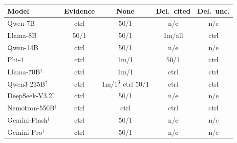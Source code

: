 \begin{tabular}{@{}lcccc@{}}
\toprule
Model & Evidence & None & Del.\ cited & Del.\ unc. \\
\midrule
Qwen-7B & ctrl & 50/1 & n/e & n/e \\
Llama-8B & 50/1 & 50/1 & 1m/all & ctrl \\
Qwen-14B & ctrl & 50/1 & n/e & n/e \\
Phi-4 & ctrl & 1m/1 & 50/1 & ctrl \\
Llama-70B$^\dagger$ & ctrl & 1m/1 & ctrl & ctrl \\
Qwen3-235B$^\dagger$ & ctrl & 1m/1$^{3}$ ctrl 50/1 & ctrl & ctrl \\
DeepSeek-V3.2$^\dagger$ & ctrl & 50/1 & n/e & n/e \\
Nemotron-550B$^\dagger$ & ctrl & ctrl & ctrl & ctrl \\
Gemini-Flash$^\dagger$ & ctrl & 50/1 & n/e & n/e \\
Gemini-Pro$^\dagger$ & ctrl & 50/1 & n/e & n/e \\
\bottomrule
\end{tabular}
